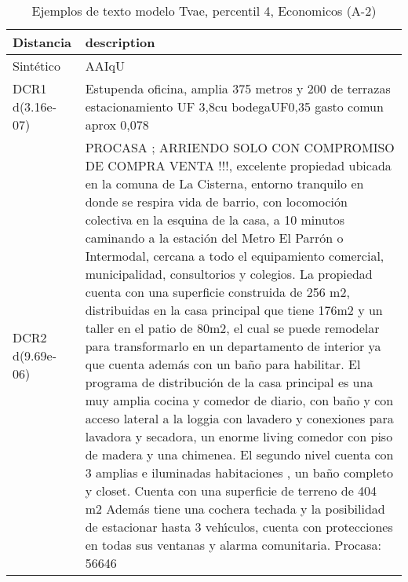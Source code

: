 \begin{table}[H]
\centering
\fontsize{10}{14}\selectfont
\caption{Ejemplos de texto modelo Tvae, percentil 4, Economicos (A-2)}
\label{table-example-economicos-a-2-tvae-4p-text}
\begin{tabular}{|l|m{35em}|}
\hline
\rowcolor[gray]{0.8}
Distancia & description \\
\hline Sintético & AAIqU \\
\hline DCR1 d(3.16e-07) & Estupenda oficina, amplia 375 metros y 200 de terrazas
estacionamiento UF 3,8cu
bodegaUF0,35
gasto comun aprox 0,078 \\
\hline DCR2 d(9.69e-06) & PROCASA  ; ARRIENDO SOLO CON COMPROMISO DE COMPRA VENTA !!!, excelente propiedad ubicada en la comuna de La Cisterna, entorno tranquilo en donde se respira vida de barrio, con locomoci\'on colectiva en la esquina de la casa, a 10 minutos caminando a la estaci\'on del Metro El Parr\'on o Intermodal, cercana a todo el equipamiento comercial, municipalidad, consultorios y colegios.    La propiedad cuenta con una superficie construida de 256 m2, distribuidas en la casa principal que tiene 176m2 y un taller en el patio de 80m2, el cual se puede remodelar para transformarlo en un departamento de interior ya que cuenta adem\'as con un ba\~no para habilitar.    El programa de distribuci\'on de la casa principal es una muy amplia cocina y comedor de diario, con ba\~no y con acceso lateral a la loggia con lavadero y conexiones para lavadora y secadora, un enorme living comedor con piso de madera y una chimenea.    El segundo nivel cuenta con 3 amplias e iluminadas habitaciones , un ba\~no completo y closet.    Cuenta con una superficie de terreno de 404 m2    Adem\'as tiene una cochera techada y la posibilidad de estacionar hasta 3 veh{\'\i}culos, cuenta con protecciones en todas sus ventanas y alarma comunitaria.  Procasa: 56646 \\
\hline
\end{tabular}
\end{table}
